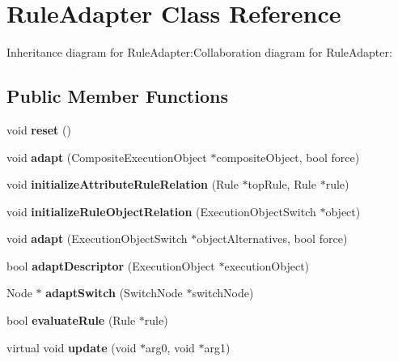 \section{RuleAdapter Class Reference}
\label{classbr_1_1pucrio_1_1telemidia_1_1ginga_1_1ncl_1_1adaptation_1_1context_1_1RuleAdapter}
Inheritance diagram for RuleAdapter:Collaboration diagram for RuleAdapter:\subsection*{Public Member Functions}
\begin{CompactItemize}
\item 
void \textbf{reset} ()\label{classbr_1_1pucrio_1_1telemidia_1_1ginga_1_1ncl_1_1adaptation_1_1context_1_1RuleAdapter_d20897c5c8bd47f5d4005989bead0e55}

\item 
void \textbf{adapt} (CompositeExecutionObject $\ast$compositeObject, bool force)\label{classbr_1_1pucrio_1_1telemidia_1_1ginga_1_1ncl_1_1adaptation_1_1context_1_1RuleAdapter_b1402b880b32540f95fa60ca4487852e}

\item 
void \textbf{initializeAttributeRuleRelation} (Rule $\ast$topRule, Rule $\ast$rule)\label{classbr_1_1pucrio_1_1telemidia_1_1ginga_1_1ncl_1_1adaptation_1_1context_1_1RuleAdapter_c565cac0f6a763127f1c0c626307c77d}

\item 
void \textbf{initializeRuleObjectRelation} (ExecutionObjectSwitch $\ast$object)\label{classbr_1_1pucrio_1_1telemidia_1_1ginga_1_1ncl_1_1adaptation_1_1context_1_1RuleAdapter_af45e711537a24e31543803b078741e4}

\item 
void \textbf{adapt} (ExecutionObjectSwitch $\ast$objectAlternatives, bool force)\label{classbr_1_1pucrio_1_1telemidia_1_1ginga_1_1ncl_1_1adaptation_1_1context_1_1RuleAdapter_e0280f6ca3290e0e77765acee6664b37}

\item 
bool \textbf{adaptDescriptor} (ExecutionObject $\ast$executionObject)\label{classbr_1_1pucrio_1_1telemidia_1_1ginga_1_1ncl_1_1adaptation_1_1context_1_1RuleAdapter_33616b5d0b1b61db421115f580889e9f}

\item 
Node $\ast$ \textbf{adaptSwitch} (SwitchNode $\ast$switchNode)\label{classbr_1_1pucrio_1_1telemidia_1_1ginga_1_1ncl_1_1adaptation_1_1context_1_1RuleAdapter_079658cba021c764bf13e0dd931e21e9}

\item 
bool \textbf{evaluateRule} (Rule $\ast$rule)\label{classbr_1_1pucrio_1_1telemidia_1_1ginga_1_1ncl_1_1adaptation_1_1context_1_1RuleAdapter_241f3819b4193567d6c250b7e13288c6}

\item 
virtual void \textbf{update} (void $\ast$arg0, void $\ast$arg1)\label{classbr_1_1pucrio_1_1telemidia_1_1ginga_1_1ncl_1_1adaptation_1_1context_1_1RuleAdapter_6be8f6ebf7d9b3820dbc68336558859d}

\end{CompactItemize}

